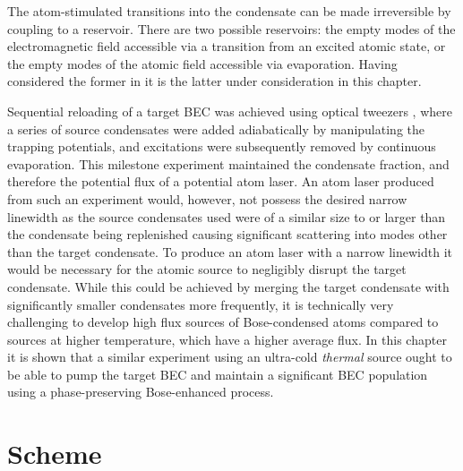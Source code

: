 The atom-stimulated transitions into the condensate can be made irreversible by coupling to a reservoir. There are two possible reservoirs: the empty modes of the electromagnetic field accessible via a transition from an excited atomic state, or the empty modes of the atomic field accessible via evaporation. Having considered the former in  it is the latter under consideration in this chapter.

Sequential reloading of a target BEC was achieved using optical tweezers \citep{Chikkatur:2002qa}, where a series of source condensates were added adiabatically by manipulating the trapping potentials, and excitations were subsequently removed by continuous evaporation. This milestone experiment maintained the condensate fraction, and therefore the potential flux of a potential atom laser. An atom laser produced from such an experiment would, however, not possess the desired narrow linewidth as the source condensates used were of a similar size to or larger than the condensate being replenished causing significant scattering into modes other than the target condensate. To produce an atom laser with a narrow linewidth it would be necessary for the atomic source to negligibly disrupt the target condensate. While this could be achieved by merging the target condensate with significantly smaller condensates more frequently, it is technically very challenging to develop high flux sources of Bose-condensed atoms compared to sources at higher temperature, which have a higher average flux. In this chapter it is shown that a similar experiment using an ultra-cold \emph{thermal} source ought to be able to pump the target BEC and maintain a significant BEC population using a phase-preserving Bose-enhanced process.


\section{Scheme}
\label{KineticTheory:Scheme}

